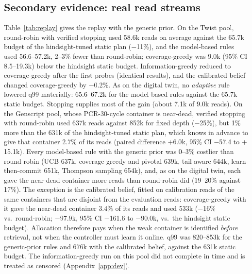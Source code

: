 \documentclass[conference,onecolumn,11pt]{IEEEtran}
\begin{document}
\subsection{Secondary evidence: real read streams}\label{sec:res-replay}

Table~\ref{tab:replay} gives the replay with the generic prior.  On the Twist pool,
round-robin with verified stopping used 58.6k reads on average against the 65.7k budget of the
hindsight-tuned static plan ($-$11\%), and the model-based rules used 56.6--57.2k, 2--3\% fewer
than round-robin; coverage-greedy was 9.0k (95\% CI 8.5--19.3k) below the hindsight static budget.
Information-greedy reduced to coverage-greedy after the first probes (identical results), and
the calibrated belief changed coverage-greedy by $-$0.2\%.  As on the digital twin, no \emph{adaptive}
rule lowered q99 materially: 65.6--67.2k for the model-based rules against the 65.7k static budget.  Stopping supplies most of the gain
(about 7.1k of 9.0k reads).
On the Genscript pool, whose PCR-30-cycle container is near-dead, verified stopping with
round-robin used 637k reads against 852k for fixed depth ($-$25\%), but 1\% more than the 631k of
the hindsight-tuned static plan, which knows in advance to give that container 2.7\% of its reads
(paired difference $+$6.0k, 95\% CI $-$57.4 to $+$15.1k).  Every model-based rule with the generic
prior was 0--3\% costlier than round-robin (UCB 637k, coverage-greedy and pivotal 639k, tail-aware
644k, learn-then-commit 651k, Thompson sampling 654k), and, as on the digital twin, each gave the
near-dead container more reads than round-robin did (19--20\% against 17\%).  The exception is the
calibrated belief, fitted on calibration reads of the same containers that are disjoint from the
evaluation reads: coverage-greedy with it gave the near-dead container 3.4\% of its reads and
used 533k ($-$16\% vs.\ round-robin; $-$97.9k, 95\% CI $-$161.6 to $-$90.0k, vs.\ the hindsight static
budget).  Allocation therefore pays when the weak container is identified \emph{before} retrieval,
not when the controller must learn it online.  q99 was 820--853k for the generic-prior rules and 676k
with the calibrated belief, against the 631k static budget.  The information-greedy run on this pool
did not complete in time and is treated as censored (Appendix~\ref{app:dev}).
\end{document}
